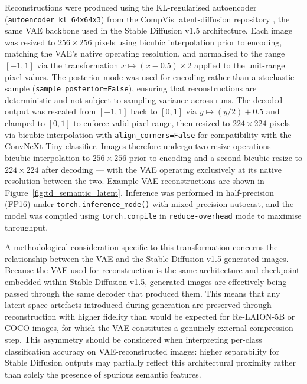 Reconstructions were produced using the KL-regularised autoencoder 
(\texttt{autoencoder\_kl\_64x64x3}) from the CompVis latent-diffusion 
repository \cite{Rombach_2022_CVPR}, the same VAE backbone used in the 
Stable Diffusion v1.5 architecture. Each image was resized to $256 \times 
256$ pixels using bicubic interpolation prior to encoding, matching the 
VAE's native operating resolution, and normalised to the range $[-1, 1]$ 
via the transformation $x \mapsto (x - 0.5) \times 2$ applied to the 
unit-range pixel values. The posterior mode was used for encoding rather 
than a stochastic sample (\texttt{sample\_posterior=False}), ensuring that 
reconstructions are deterministic and not subject to sampling variance 
across runs. The decoded output was rescaled from $[-1, 1]$ back to $[0, 1]$ 
via $y \mapsto (y / 2) + 0.5$ and clamped to $[0, 1]$ to enforce valid 
pixel range, then resized to $224 \times 224$ pixels via bicubic 
interpolation with \texttt{align\_corners=False} for compatibility with the 
ConvNeXt-Tiny classifier. Images therefore undergo two resize operations — 
bicubic interpolation to $256 \times 256$ prior to encoding and a second 
bicubic resize to $224 \times 224$ after decoding — with the VAE operating 
exclusively at its native resolution between the two. Example VAE reconstructions are shown in 
Figure~\ref{fig:td_semantic_latent}. Inference was 
performed in half-precision (FP16) under \texttt{torch.inference\_mode()} 
with mixed-precision autocast, and the model was compiled using 
\texttt{torch.compile} in \texttt{reduce-overhead} mode to maximise 
throughput.

A methodological consideration specific to this transformation concerns the 
relationship between the VAE and the Stable Diffusion v1.5 generated images. 
Because the VAE used for reconstruction is the same architecture and 
checkpoint embedded within Stable Diffusion v1.5, generated images are 
effectively being passed through the same decoder that produced them. This 
means that any latent-space artefacts introduced during generation are 
preserved through reconstruction with higher fidelity than would be expected 
for Re-LAION-5B or COCO images, for which the VAE constitutes a genuinely 
external compression step. This asymmetry should be considered when 
interpreting per-class classification accuracy on VAE-reconstructed images: 
higher separability for Stable Diffusion outputs may partially reflect this 
architectural proximity rather than solely the presence of spurious semantic 
features.

